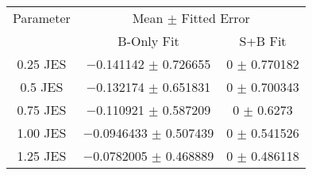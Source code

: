 \begin{scriptsize}
\begin{table}
\centering
\begin{tabular}{ccc}
\toprule
Parameter & \multicolumn{2}{c}{{Mean $\pm$ Fitted Error}}\\
 & {B-Only Fit} & {S+B Fit}\\
\midrule
\num[round-precision=2]{0.25} JES & \num{-0.141142} $\pm$ \num{0.726655} & \num{0} $\pm$ \num{0.770182}\\
\num[round-precision=2]{0.5} JES & \num{-0.132174} $\pm$ \num{0.651831} & \num{0} $\pm$ \num{0.700343}\\
\num[round-precision=2]{0.75} JES & \num{-0.110921} $\pm$ \num{0.587209} & \num{0} $\pm$ \num{0.6273}\\
\num[round-precision=2]{1.00} JES & \num{-0.0946433} $\pm$ \num{0.507439} & \num{0} $\pm$ \num{0.541526}\\
\num[round-precision=2]{1.25} JES & \num{-0.0782005} $\pm$ \num{0.468889} & \num{0} $\pm$ \num{0.486118}\\
\bottomrule
\end{tabular}
\end{table}
\end{scriptsize}
